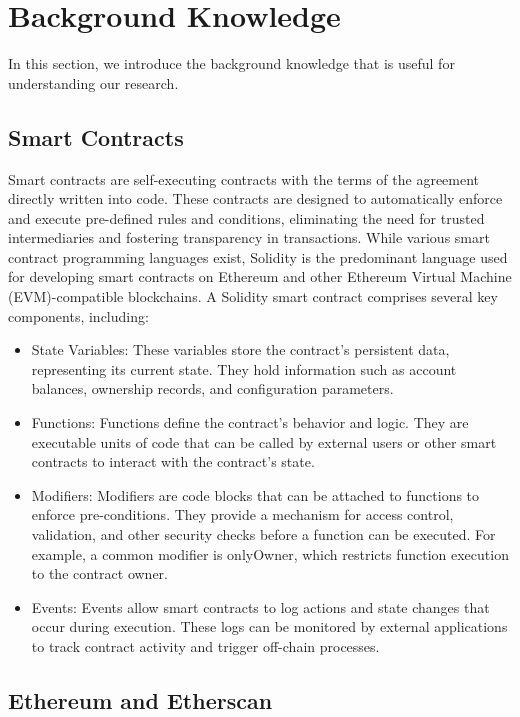 \documentclass[acmsmall,screen]{acmart}
\begin{document}
	\section{Background Knowledge}\label{sec:background}
	In this section, we introduce the background knowledge that is useful for understanding our research.

	\subsection{Smart Contracts}
	Smart contracts \cite{smartcontract} are self-executing contracts with the terms of the agreement directly written into code. These contracts are designed to automatically enforce and execute pre-defined rules and conditions, eliminating the need for trusted intermediaries and fostering transparency in transactions. While various smart contract programming languages exist, Solidity \cite{solidity} is the predominant language used for developing smart contracts on Ethereum and other Ethereum Virtual Machine (EVM)-compatible blockchains.
	A Solidity smart contract comprises several key components, including:
	\begin{itemize}[leftmargin=0.4cm,topsep=0.1cm]
		\item State Variables: These variables store the contract's persistent data, representing its current state. They hold information such as account balances, ownership records, and configuration parameters.
		\item Functions: Functions define the contract's behavior and logic. They are executable units of code that can be called by external users or other smart contracts to interact with the contract's state.
		\item Modifiers: Modifiers are code blocks that can be attached to functions to enforce pre-conditions. They provide a mechanism for access control, validation, and other security checks before a function can be executed. For example, a common modifier is onlyOwner, which restricts function execution to the contract owner.
		\item Events: Events allow smart contracts to log actions and state changes that occur during execution. These logs can be monitored by external applications to track contract activity and trigger off-chain processes.
	\end{itemize}

	\subsection{Ethereum and Etherscan}
\end{document}
